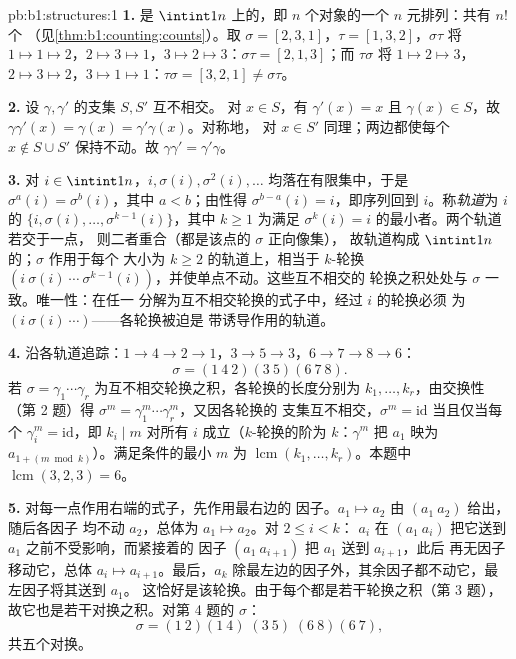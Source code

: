 \begin{solution}{pb:b1:structures:1}
\textbf{1.} 是 $\intint1n$ 上的，即
$n$ 个对象的一个 $n$ 元排列：共有 $n!$ 个
（见\cref{thm:b1:counting:counts}）。取 $\sigma = [2,3,1]$，$\tau =
[1,3,2]$，$\sigma\tau$ 将 $1 \mapsto 1 \mapsto 2$，$2 \mapsto 3
\mapsto 1$，$3 \mapsto 2 \mapsto 3$：$\sigma\tau = [2,1,3]$；而
$\tau\sigma$ 将 $1 \mapsto 2 \mapsto 3$，$2 \mapsto 3 \mapsto
2$，$3 \mapsto 1 \mapsto 1$：$\tau\sigma = [3,2,1] \neq
\sigma\tau$。

\textbf{2.} 设 $\gamma, \gamma'$ 的支集 $S, S'$ 互不相交。
对 $x \in S$，有 $\gamma'(x) = x$ 且 $\gamma(x) \in S$，故
$\gamma\gamma'(x) = \gamma(x) = \gamma'\gamma(x)$。对称地，
对 $x \in S'$ 同理；两边都使每个 $x \notin S \cup S'$ 保持不动。故
$\gamma\gamma' = \gamma'\gamma$。

\textbf{3.} 对 $i \in \intint1n$，$i, \sigma(i),
\sigma^2(i), \dots$ 均落在有限集中，于是 $\sigma^a(i) =
\sigma^b(i)$，其中 $a < b$；由性得 $\sigma^{b-a}(i)
= i$，即序列回到 $i$。称\emph{轨道}为 $i$ 的
 $\{i, \sigma(i), \dots, \sigma^{k-1}(i)\}$，其中 $k \geq 1$
为满足 $\sigma^k(i) = i$ 的最小者。两个轨道若交于一点，
则二者重合（都是该点的 $\sigma$ 正向像集），
故轨道构成 $\intint1n$ 的；$\sigma$ 作用于每个
大小为 $k \geq 2$ 的轨道上，相当于 $k$-轮换 $(i\ \sigma(i)\ \cdots\
\sigma^{k-1}(i))$，并使单点不动。这些互不相交的
轮换之积处处与 $\sigma$ 一致。唯一性：在任一
分解为互不相交轮换的式子中，经过 $i$ 的轮换必须
为 $(i\ \sigma(i)\ \cdots)$——各轮换被迫是
带诱导作用的轨道。

\textbf{4.} 沿各轨道追踪：$1 \to 4 \to 2 \to 1$，$3 \to 5
\to 3$，$6 \to 7 \to 8 \to 6$：
\[
\sigma = (1\ 4\ 2)(3\ 5)(6\ 7\ 8) .
\]
若 $\sigma = \gamma_1\cdots\gamma_r$ 为互不相交轮换之积，各轮换的长度分别为
$k_1, \dots, k_r$，由交换性（第 2 题）得
$\sigma^m = \gamma_1^m\cdots\gamma_r^m$，又因各轮换的
支集互不相交，$\sigma^m = \mathrm{id}$ 当且仅当每个 $\gamma_i^m =
\mathrm{id}$，即 $k_i \mid m$ 对所有 $i$ 成立（$k$-轮换的阶为
$k$：$\gamma^m$ 把 $a_1$ 映为 $a_{1 + (m \bmod k)}$）。满足条件的最小
$m$ 为 $\operatorname{lcm}(k_1, \dots, k_r)$。本题中
$\operatorname{lcm}(3, 2, 3) = 6$。

\textbf{5.} 对每一点作用右端的式子，先作用最右边的
因子。$a_1 \mapsto a_2$ 由 $(a_1\ a_2)$ 给出，随后各因子
均不动 $a_2$，总体为 $a_1 \mapsto a_2$。对 $2 \leq i < k$：
$a_i$ 在 $(a_1\ a_i)$ 把它送到 $a_1$ 之前不受影响，而紧接着的
因子 $(a_1\ a_{i+1})$ 把 $a_1$ 送到 $a_{i+1}$，此后
再无因子移动它，总体 $a_i \mapsto a_{i+1}$。最后，$a_k$
除最左边的因子外，其余因子都不动它，最左因子将其送到 $a_1$。
这恰好是该轮换。由于每个都是若干轮换之积（第 3 题），
故它也是若干对换之积。对第 4 题的
$\sigma$：
\[
\sigma = (1\ 2)(1\ 4)\;(3\ 5)\;(6\ 8)(6\ 7),
\]
共五个对换。


\end{solution}
